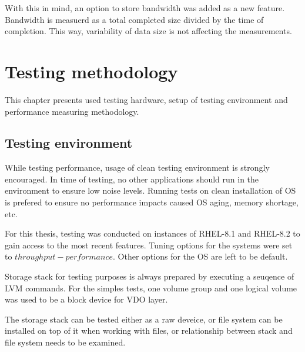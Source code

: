 \documentclass[
  color, %
  table, %
  lof,   %
  lot,   %
]{fithesis3}
\begin{document}
With this in mind, an option to store bandwidth was added as a new feature. Bandwidth is measuerd as a total completed size divided by the time of completion. This way, variability of data size is not affecting the measurements.




\chapter{Testing methodology}
\label{methodology}
This chapter presents used testing hardware, setup of testing environment and performance measuring methodology.


\section{Testing environment}
While testing performance, usage of clean testing environment is strongly encouraged. In time of testing, no other applications should run in the environment to ensure low noise levels. Running tests on clean installation of OS is prefered to ensure no performance impacts caused OS aging, memory shortage, etc.

For this thesis, testing was conducted on instances of RHEL-8.1 and RHEL-8.2 to gain access to the most recent features. Tuning options for the systems were set to $throughput-performance$. Other options for the OS are left to be default.

Storage stack for testing purposes is always prepared by executing a seuqence of LVM commands. For the simples tests, one volume group and one logical volume was used to be a block device for VDO layer.

The storage stack can be tested either as a raw deveice, or file system can be installed on top of it when working with files, or relationship between stack and file system needs to be examined.
\end{document}
